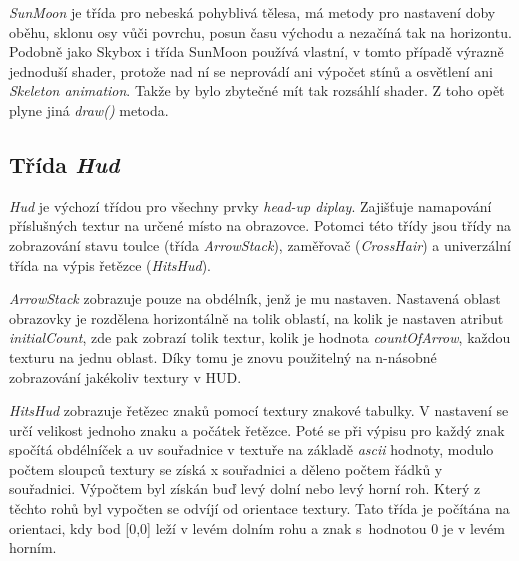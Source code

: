 \emph{SunMoon} je třída pro nebeská pohyblivá tělesa, má metody pro nastavení doby oběhu, sklonu osy vůči povrchu, posun času východu a nezačíná tak na horizontu. Podobně jako Skybox i třída SunMoon používá vlastní, v tomto případě výrazně jednoduší shader, protože nad ní se neprovádí ani  výpočet stínů a osvětlení ani \emph{Skeleton animation}. Takže by bylo zbytečné mít tak rozsáhlí shader. Z toho opět plyne jiná \emph{draw()} metoda.        
\subsection{Třída \emph{Hud}}   
\emph{Hud} je výchozí třídou pro všechny prvky \emph{head-up diplay}. Zajišťuje namapování příslušných textur na určené místo na obrazovce. Potomci této třídy  jsou třídy na zobrazování stavu toulce (třída \emph{ArrowStack}), zaměřovač (\emph{CrossHair}) a univerzální třída na výpis řetězce (\emph{HitsHud}).

\emph{ArrowStack} zobrazuje pouze na obdélník, jenž je mu nastaven. Nastavená oblast obrazovky je rozdělena horizontálně na tolik oblastí, na kolik je nastaven atribut \emph{initialCount}, zde pak zobrazí tolik textur, kolik je hodnota \emph{countOfArrow}, každou texturu na jednu oblast. Díky tomu je znovu použitelný na n-násobné zobrazování jakékoliv textury v HUD.
 
\emph{HitsHud} zobrazuje řetězec znaků pomocí textury znakové tabulky. V nastavení se určí velikost jednoho znaku a počátek řetězce. Poté se při výpisu pro každý znak spočítá obdélníček a uv souřadnice v textuře na základě \emph{ascii} hodnoty, modulo počtem sloupců textury se získá x souřadnici a děleno počtem řádků y souřadnici. Výpočtem byl získán buď levý dolní nebo levý horní roh. Který z těchto rohů byl vypočten se odvíjí od orientace textury. Tato třída je počítána na orientaci, kdy bod [0,0] leží v levém dolním rohu a znak s~hodnotou 0 je v levém horním.  
